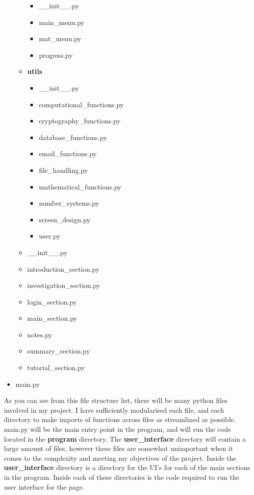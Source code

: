 \documentclass{article}
\begin{document}
\begin{itemize}
\begin{itemize}
\begin{itemize}
\begin{itemize}
            \end{itemize}
            \item \_\_init\_\_.py
            \item main\_menu.py
            \item mat\_menu.py
            \item progress.py
        \end{itemize}
        \item \textbf{utils}
        \begin{itemize}
            \item \_\_init\_\_.py
            \item computational\_functions.py
            \item cryptography\_functions.py
            \item database\_functions.py
            \item email\_functions.py
            \item file\_handling.py
            \item mathematical\_functions.py
            \item number\_systems.py
            \item screen\_design.py
            \item user.py
        \end{itemize}
        \item \_\_init\_\_.py
        \item introduction\_section.py
        \item investigation\_section.py
        \item login\_section.py
        \item main\_section.py
        \item notes.py
        \item summary\_section.py
        \item tutorial\_section.py
    \end{itemize}
    \item main.py
\end{itemize}

As you can see from this file structure list, there will be many python files involved in my project. I have sufficiently modularised each file, and each directory to make imports of functions across files as streamlined as possible. main.py will be the main entry point in the program, and will run the code located in the \textbf{program} directory. The \textbf{user\_interface} directory will contain a large amount of files, however these files are somewhat unimportant when it comes to the complexity and meeting my objectives of the project. Inside the \textbf{user\_interface} directory is a directory for the UI's for each of the main sections in the program. Inside each of these directories is the code required to run the user interface for the page.
\end{document}
